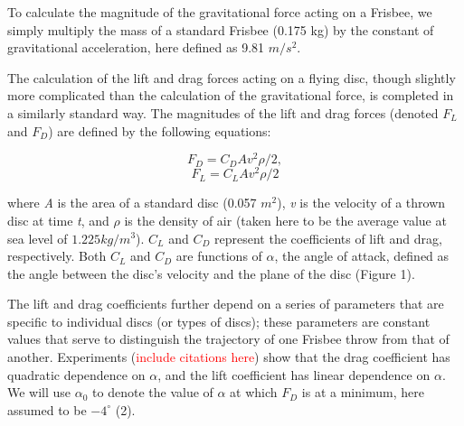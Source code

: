 \documentclass[a4paper,12pt, oneside]{article}
\newcommand{\red}[1]{\textcolor{red}{#1}}
\begin{document}
To calculate the magnitude of the gravitational force acting on a Frisbee, we simply multiply the mass of a standard Frisbee (0.175 kg) by the constant of gravitational acceleration, here defined as  9.81 $m/s^{2}.$ 
 
The calculation of the lift and drag forces acting on a flying disc, though slightly more complicated than the calculation of the gravitational force, is completed in a similarly standard way. The magnitudes of the lift and drag forces (denoted $F_L$ and $F_D$) are defined by the following equations:

\begin{equation}
  F_D=C_DAv^2\rho/2,
\end{equation}
\begin{equation}
  F_L=C_LAv^2\rho/2
\end{equation}

where \textit{A} is the area of a standard disc (0.057 $m^2$), \textit{v} is the velocity of a thrown disc at time \textit{t}, and $\rho$ is the density of air (taken here to be the average value at sea level of $1.225 kg/m^3$). $C_L$ and $C_D$ represent the coefficients of lift and drag, respectively. Both $C_L$ and $C_D$ are functions of $\alpha$, the angle of attack, defined as the angle between the disc's velocity and the plane of the disc (Figure 1). 

The lift and drag coefficients further depend on a series of parameters that are specific to individual discs (or types of discs); these parameters are constant values that serve to distinguish the trajectory of one Frisbee throw from that of another.  Experiments (\red{include citations here}) show that the drag coefficient has quadratic dependence on $\alpha$, and the lift coefficient has linear dependence on $\alpha$. We will use $\alpha_0$ to denote the value of $\alpha$ at which $F_D$ is at a minimum, here assumed to be $-4^{\circ}$ (2).
\end{document}
